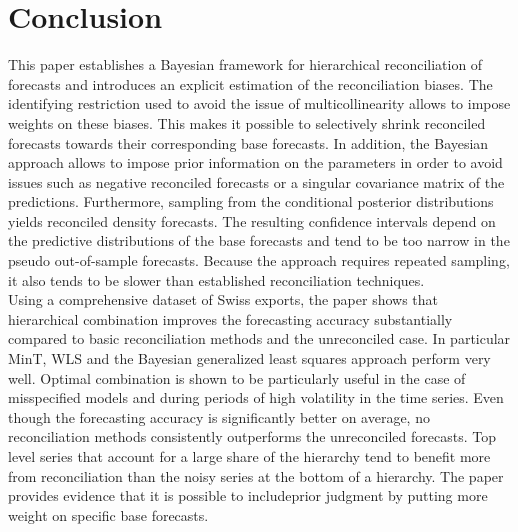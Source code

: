 \documentclass[a4paper,fleqn,11pt]{article}
\begin{document}
\section{Conclusion}
This paper establishes a Bayesian framework for hierarchical reconciliation of forecasts and introduces an explicit estimation of the reconciliation biases. The identifying restriction used to avoid the issue of multicollinearity allows to impose weights on these biases. This makes it possible to selectively shrink reconciled forecasts towards their corresponding base forecasts. In addition, the Bayesian approach allows to impose prior information on the parameters in order to avoid issues such as negative reconciled forecasts or a singular covariance matrix of the predictions. Furthermore, sampling from the conditional posterior distributions yields reconciled density forecasts. The resulting confidence intervals depend on the predictive distributions of the base forecasts and tend to be too narrow in the pseudo out-of-sample forecasts. Because the approach requires repeated sampling, it also tends to be slower than established reconciliation techniques. \\

Using a comprehensive dataset of Swiss exports, the paper shows that hierarchical combination improves the forecasting accuracy substantially compared to basic reconciliation methods and the unreconciled case. In particular MinT, WLS and the Bayesian generalized least squares approach perform very well. Optimal combination is shown to be particularly useful in the case of misspecified models and during periods of high volatility in the time series. Even though the forecasting accuracy is significantly better on average, no reconciliation methods consistently outperforms the unreconciled forecasts. Top level series that account for a large share of the hierarchy tend to benefit more from reconciliation than the noisy series at the bottom of a hierarchy. The paper provides evidence that it is possible to includeprior judgment by putting more weight on specific base forecasts. 




\clearpage

\setcounter{page}{3}



\clearpage



\end{document}
